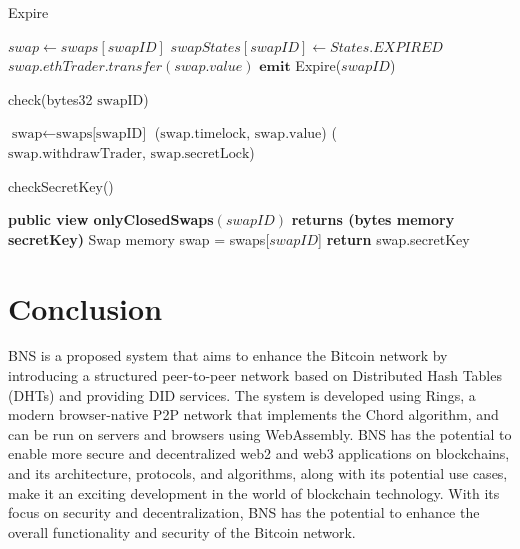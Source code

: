 \documentclass[twocolumn]{article}
\begin{document}
\begin{algorithm}[htbp]
\caption{Expire}
\begin{algorithmic}[1]
\State $swap \gets swaps[{swapID}]$
\State $swapStates[{swapID}] \gets States.EXPIRED$
\State $swap.ethTrader.transfer(swap.value)$
\State $\textbf{emit}$ Expire(${swapID}$)
\EndFunction
\end{algorithmic}
\end{algorithm}

\begin{algorithm}[htbp]
\caption{check(bytes32 $\text{swapID}$)}
\begin{algorithmic}[1]
\State $\text{swap} \gets \text{swaps[}\text{swapID}\text{]}$
\State \Return ($\text{swap.timelock, swap.value}$)
\State \Return ($\text{swap.withdrawTrader, swap.secretLock}$)
\EndFunction
\end{algorithmic}
\end{algorithm}

\begin{algorithm}[htbp]
\caption{checkSecretKey()}
\begin{algorithmic}[1]
\State \textbf{public view onlyClosedSwaps}$({swapID})$
\State \textbf{returns (bytes memory secretKey)}
\State Swap memory swap = swaps[${swapID}$]
\State \textbf{return} swap.secretKey
\EndFunction
\end{algorithmic}
\end{algorithm}

\section{Conclusion}

BNS is a proposed system that aims to enhance the Bitcoin network by introducing a structured peer-to-peer network based on Distributed Hash Tables (DHTs) and providing DID services. The system is developed using Rings, a modern browser-native P2P network that implements the Chord algorithm, and can be run on servers and browsers using WebAssembly. BNS has the potential to enable more secure and decentralized web2 and web3 applications on blockchains, and its architecture, protocols, and algorithms, along with its potential use cases, make it an exciting development in the world of blockchain technology. With its focus on security and decentralization, BNS has the potential to enhance the overall functionality and security of the Bitcoin network.




\end{document}
